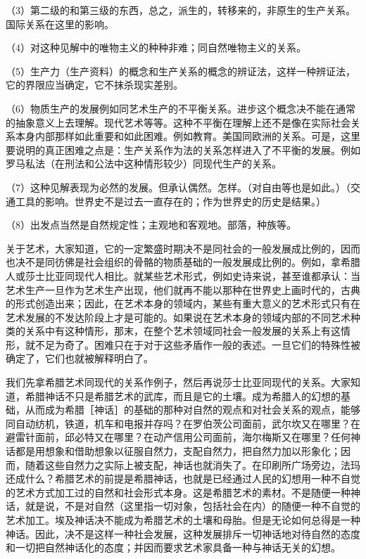 \documentclass[a4paper,twoside,12pt]{ctexart}
\begin{document}
（3）第二级的和第三级的东西，总之，派生的，转移来的，非原生的生产关系。国际关系在这里的影响。

（4）对这种见解中的唯物主义的种种非难；同自然唯物主义的关系。

（5）生产力（生产资料）的概念和生产关系的概念的辨证法，这样一种辨证法，它的界限应当确定，它不抹杀现实差别。

（6）物质生产的发展例如同艺术生产的不平衡关系。进步这个概念决不能在通常的抽象意义上去理解。现代艺术等等。这种不平衡在理解上还不是像在实际社会关系本身内部那样如此重要和如此困难。例如教育。美国同欧洲的关系。可是，这里要说明的真正困难之点是：生产关系作为法的关系怎样进入了不平衡的发展。例如罗马私法（在刑法和公法中这种情形较少）同现代生产的关系。

（7）这种见解表现为必然的发展。但承认偶然。怎样。（对自由等也是如此。）（交通工具的影响。世界史不是过去一直存在的；作为世界史的历史是结果。）

（8）出发点当然是自然规定性；主观地和客观地。部落，种族等。

关于艺术，大家知道，它的一定繁盛时期决不是同社会的一般发展成比例的，因而也决不是同彷佛是社会组织的骨骼的物质基础的一般发展成比例的。例如，拿希腊人或莎士比亚同现代人相比。就某些艺术形式，例如史诗来说，甚至谁都承认：当艺术生产一旦作为艺术生产出现，他们就再不能以那种在世界史上画时代的，古典的形式创造出来；因此，在艺术本身的领域内，某些有重大意义的艺术形式只有在艺术发展的不发达阶段上才是可能的。如果说在艺术本身的领域内部的不同艺术种类的关系中有这种情形，那末，在整个艺术领域同社会一般发展的关系上有这情形，就不足为奇了。困难只在于对于这些矛盾作一般的表述。一旦它们的特殊性被确定了，它们也就被解释明白了。

我们先拿希腊艺术同现代的关系作例子，然后再说莎士比亚同现代的关系。大家知道，希腊神话不只是希腊艺术的武库，而且是它的土壤。成为希腊人的幻想的基础，从而成为希腊［神话］的基础的那种对自然的观点和对社会关系的观点，能够同自动纺机，铁道，机车和电报并存吗？在罗伯茨公司面前，武尔坎又在哪里？在避雷针面前，邱必特又在哪里？在动产信用公司面前，海尔梅斯又在哪里？任何神话都是用想象和借助想象以征服自然力，支配自然力，把自然力加以形象化；因而，随着这些自然力之实际上被支配，神话也就消失了。在印刷所广场旁边，法玛还成什么？希腊艺术的前提是希腊神话，也就是已经通过人民的幻想用一种不自觉的艺术方式加工过的自然和社会形式本身。这是希腊艺术的素材。不是随便一种神话，就是说，不是对自然（这里指一切对象，包括社会在内）的随便一种不自觉的艺术加工。埃及神话决不能成为希腊艺术的土壤和母胎。但是无论如何总得是一种神话。因此，决不是这样一种社会发展，这种发展排斥一切神话地对待自然的态度和一切把自然神话化的态度；并因而要求艺术家具备一种与神话无关的幻想。
\end{document}
